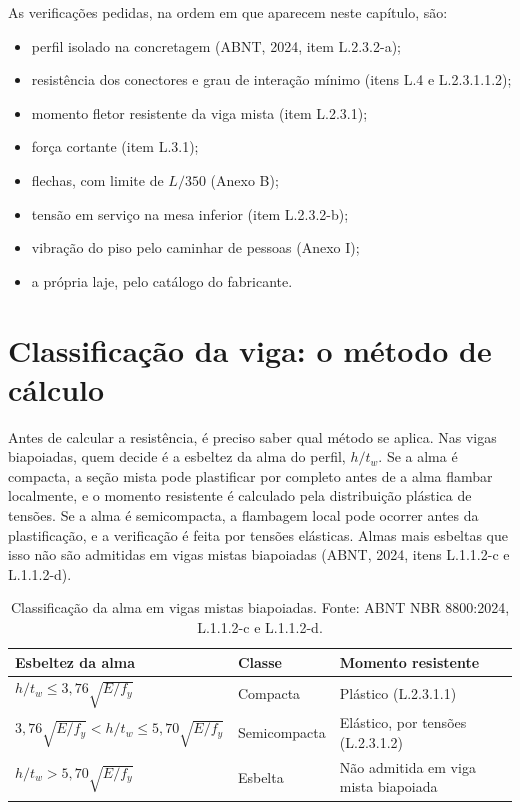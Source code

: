 \documentclass[11pt,a4paper]{article}
\begin{document}
As verificações pedidas, na ordem em que aparecem neste capítulo, são:
\begin{itemize}
  \item perfil isolado na concretagem (ABNT, 2024, item L.2.3.2-a);
  \item resistência dos conectores e grau de interação mínimo (itens L.4 e L.2.3.1.1.2);
  \item momento fletor resistente da viga mista (item L.2.3.1);
  \item força cortante (item L.3.1);
  \item flechas, com limite de $L/350$ (Anexo B);
  \item tensão em serviço na mesa inferior (item L.2.3.2-b);
  \item vibração do piso pelo caminhar de pessoas (Anexo I);
  \item a própria laje, pelo catálogo do fabricante.
\end{itemize}

\section{Classificação da viga: o método de cálculo}

Antes de calcular a resistência, é preciso saber qual método se aplica. Nas vigas biapoiadas, quem decide é a esbeltez da alma do perfil, $h/t_w$. Se a alma é compacta, a seção mista pode plastificar por completo antes de a alma flambar localmente, e o momento resistente é calculado pela distribuição plástica de tensões. Se a alma é semicompacta, a flambagem local pode ocorrer antes da plastificação, e a verificação é feita por tensões elásticas. Almas mais esbeltas que isso não são admitidas em vigas mistas biapoiadas (ABNT, 2024, itens L.1.1.2-c e L.1.1.2-d).

\begin{table}[!htbp]
  \centering
  \caption{Classificação da alma em vigas mistas biapoiadas. Fonte: ABNT NBR 8800:2024, L.1.1.2-c e L.1.1.2-d.}
  \label{tab:classificacao-alma}
  \small
  \begin{tabularx}{\linewidth}{lXl}
    \toprule
    \textbf{Esbeltez da alma} & \textbf{Classe} & \textbf{Momento resistente} \\
    \midrule
    $h/t_w \le 3{,}76\sqrt{E/f_y}$ & Compacta & Plástico (L.2.3.1.1) \\
    $3{,}76\sqrt{E/f_y} < h/t_w \le 5{,}70\sqrt{E/f_y}$ & Semicompacta & Elástico, por tensões (L.2.3.1.2) \\
    $h/t_w > 5{,}70\sqrt{E/f_y}$ & Esbelta & Não admitida em viga mista biapoiada \\
    \bottomrule
  \end{tabularx}
\end{table}
\end{document}
